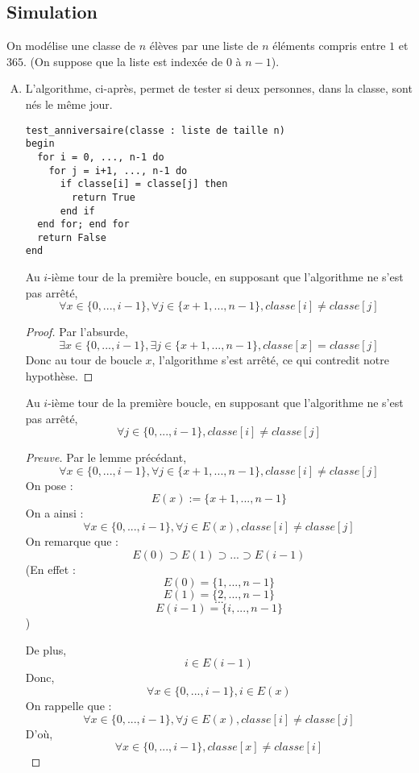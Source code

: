 \subsection{Simulation}
On modélise une classe de $n$ élèves par une
liste de $n$ éléments compris entre $1$ et $365$.
(On suppose que la liste est indexée de $0$ à $n-1$).
\begin{enumerate}[(A)]
	\item 
	L'algorithme, ci-après, 
	permet de
	tester si deux personnes, dans la classe, sont nés le même jour.
\begin{Verbatim}
test_anniversaire(classe : liste de taille n)
begin
  for i = 0, ..., n-1 do
    for j = i+1, ..., n-1 do 
      if classe[i] = classe[j] then 
        return True
      end if
  end for; end for
  return False
end
\end{Verbatim}


\begin{fLemma}
Au $i$-ième tour de la première boucle,
en supposant que l'algorithme ne s'est pas arrêté,
$$
\forall x\in\{0, ..., i-1 \}, 
\forall j\in\{x+1, ..., n-1\}, 
classe[i] \not= classe[j]
$$
\end{fLemma}
%
\begin{proof}
Par l'absurde, 
$$
\exists x\in\{0, ..., i-1 \}, 
\exists j\in\{x+1, ..., n-1\}, 
classe[x] = classe[j]
$$
Donc au tour de boucle $x$, 
l'algorithme s'est arrêté, 
ce qui contredit notre hypothèse.
\end{proof}

\begin{fTheorem}
Au $i$-ième tour de la première boucle,
en supposant que l'algorithme ne s'est pas arrêté,
$$
	\forall j\in \{0, ..., i-1\},
	classe[i] \not= classe[j]
$$
\end{fTheorem}
\begin{proof}[Preuve]
Par le lemme précédant, 
$$
\forall x\in\{0, ..., i-1 \}, 
\forall j\in\{x+1, ..., n-1\}, 
classe[i] \not= classe[j]
$$
On pose :
$$
E(x):= \{x+1, ..., n-1\}
$$
On a ainsi : 
$$
\forall x\in\{0, ..., i-1 \}, 
\forall j\in E(x), 
classe[i] \not= classe[j]
$$
On remarque que :
$$E(0) \supset E(1) \supset ... \supset E(i-1)$$
(En effet : 
$$E(0) = \{1, ..., n-1\}$$
$$E(1) = \{2, ..., n-1\}$$
$$ ... $$
$$E(i-1) = \{i, ..., n-1\}$$
)

De plus, 
$$
i\in E(i-1)
$$
Donc, 
$$
\forall x\in\{0, ..., i-1\}, i\in E(x)
$$
On rappelle que :
$$
\forall x\in\{0, ..., i-1 \}, 
\forall j\in E(x), 
classe[i] \not= classe[j]
$$
D'où, 
$$
\forall x\in\{0, ..., i-1 \}, 
classe[x] \not= classe[i]
$$
\end{proof}
	

\end{enumerate}
